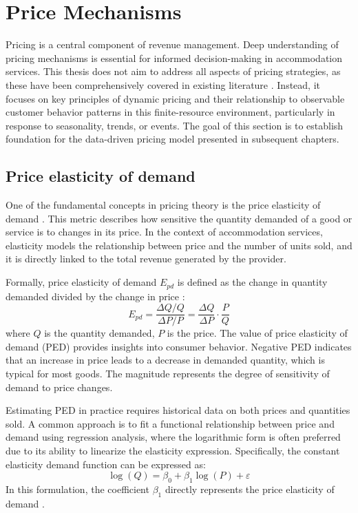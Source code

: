 \section{Price Mechanisms}
Pricing is a central component of revenue management. Deep understanding of pricing mechanisms is essential for informed decision-making in accommodation services. This thesis does not aim to address all aspects of pricing strategies, as these have been comprehensively covered in existing literature \cite{Ivanov2014, Petricek2021}. Instead, it focuses on key principles of dynamic pricing and their relationship to observable customer behavior patterns in this finite-resource environment, particularly in response to seasonality, trends, or events. The goal of this section is to establish foundation for the data-driven pricing model presented in subsequent chapters.

\subsection{Price elasticity of demand}
One of the fundamental concepts in pricing theory is the price elasticity of demand \cite{Ivanov2014}. This metric describes how sensitive the quantity demanded of a good or service is to changes in its price. In the context of accommodation services, elasticity models the relationship between price and the number of units sold, and it is directly linked to the total revenue generated by the provider.

Formally, price elasticity of demand $E_{pd}$ is defined as the change in quantity demanded divided by the change in price \cite{Petricek2021}:
\begin{equation}
    E_{pd} = \frac{\Delta Q / Q}{\Delta P / P} = \frac{\Delta Q}{\Delta P} \cdot \frac{P}{Q}
\end{equation}
where $Q$ is the quantity demanded, $P$ is the price. The value of price elasticity of demand (PED) provides insights into consumer behavior. Negative PED indicates that an increase in price leads to a decrease in demanded quantity, which is typical for most goods. The magnitude represents the degree of sensitivity of demand to price changes.

Estimating PED in practice requires historical data on both prices and quantities sold. A common approach is to fit a functional relationship between price and demand using regression analysis, where the logarithmic form is often preferred due to its ability to linearize the elasticity expression. Specifically, the constant elasticity demand function can be expressed as:
\begin{equation}
    \log(Q) = \beta_0 + \beta_1 \log(P) + \varepsilon
\end{equation}
In this formulation, the coefficient $\beta_1$ directly represents the price elasticity of demand \cite{Petricek2021}.

